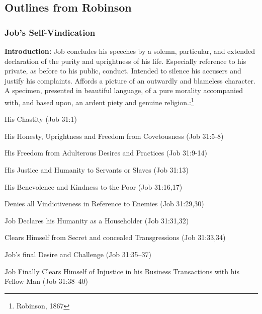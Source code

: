 \subsection{Outlines from Robinson}

\subsubsection{Job's Self-Vindication}
\textbf{Introduction:} Job concludes his speeches by a solemn, particular, and extended declaration of the purity and uprightness of his life. Especially reference to his private, as before to his public, conduct. Intended to silence his accusers and justify his complaints. Affords a  picture of an outwardly and blameless character.  A specimen, presented in beautiful language, of a pure morality accompanied with, and based upon, an ardent piety and genuine religion.\cite{robinson1876homiletical}:\footnote{Robinson, 1867}
\begin{compactenum}[I.][7]
    \item His Chastity (Job 31:1)
    \item His Honesty, Uprightness and Freedom from Covetousness (Job 31:5-8)
    \item His Freedom from Adulterous Desires and Practices  (Job 31:9-14)
    \item His Justice and Humanity to Servants or Slaves  (Job 31:13)
    \item His Benevolence and Kindness to the Poor  (Job 31:16,17)
    \item Denies all Vindictiveness in Reference to Enemies (Job 31:29,30)
    \item Job Declares his Humanity as a Householder (Job 31:31,32)
    \item Clears Himself from Secret and concealed Transgressions (Job 31:33,34)
    \item Job's final Desire and Challenge (Job 31:35--37)
    \item Job Finally Clears Himself of Injustice in his Business Transactions with his Fellow Man  (Job 31:38--40)
\end{compactenum}

